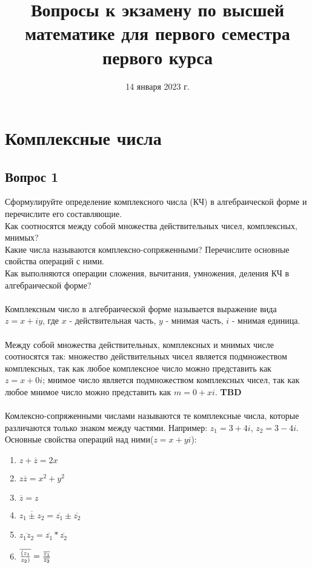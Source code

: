 \documentclass{article}
\title{Вопросы к экзамену по высшей математике для первого семестра первого курса}
\date{14 января 2023 г.}
\begin{document}
	\maketitle
	\newpage
	
	\section{Комплексные числа}
	\subsection{Вопрос 1}
	Сформулируйте определение комплексного числа (КЧ) в алгебраической форме и перечислите его составляющие. \\
	Как соотносятся между собой множества действительных чисел, комплексных, мнимых? \\
	Какие числа называются комплексно-сопряженными? Перечислите основные свойства операций с ними. \\
	Как выполняются операции сложения, вычитания, умножения, деления КЧ в алгебраической форме? \\
	
	\paragraph{}Комплексным число в алгебраической форме называется выражение вида \( z = x + iy\), где $x$ - действительная часть, $y$ - мнимая часть, $i$ - мнимая единица.
	
	\paragraph{} Между собой множества действительных, комплексных и мнимых числе соотносятся так: множество действительных чисел является подмножеством комплексных, так как любое комплексное число можно представить как \( z = x + 0i\); мнимое число является подмножеством комплексных чисел, так как любое мнимое число можно представить как \( m = 0 + xi\). \textbf{TBD}
	
	\paragraph{} Комлексно-сопряженными числами называются те комплексные числа, которые различаются только знаком между частями. Например: \( z_1 = 3 + 4i\), \( z_2 = 3 - 4i\). Основные свойства операций над ними(\( z = x + yi\)):
	\begin {enumerate}
		\item \(
			z + \overline{z} = 2x
		\)
		\item \( 
			z \overline{z} = x^2 + y^2
		\)
		\item \( 
			\overline{z} = z 
		\)
		\item \( 
			\overline{z_1 \pm z_2} = \overline{z_1} \pm \overline{z_2} 
		\)
		\item \( 
			\overline{z_1 z_2} = \overline{z_1} * \overline{z_2} 
		\)
		\item \( 
			\overline{(z_1 \over z_2)} = { {\overline{z_1}} \over \overline{z_2} } 
		\)
	\end {enumerate}
	
\end{document}
